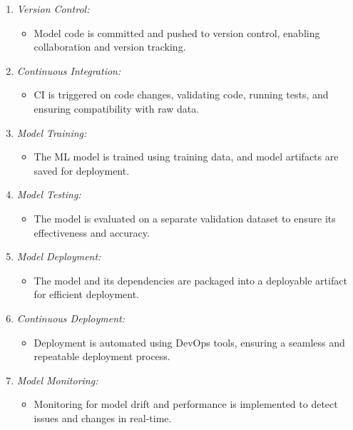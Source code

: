 \documentclass[12pt, letterpaper]{article}
\begin{document}
\begin{enumerate}
    \item \textit{Version Control:}
    \begin{itemize}
        \item Model code is committed and pushed to version control, enabling collaboration and version tracking.
    \end{itemize}
    
    \item \textit{Continuous Integration:}
    \begin{itemize}
        \item CI is triggered on code changes, validating code, running tests, and ensuring compatibility with raw data.
    \end{itemize}
    
    \item \textit{Model Training:}
    \begin{itemize}
        \item The ML model is trained using training data, and model artifacts are saved for deployment.
    \end{itemize}
    
    \item \textit{Model Testing:}
    \begin{itemize}
        \item The model is evaluated on a separate validation dataset to ensure its effectiveness and accuracy.
    \end{itemize}
    
    \item \textit{Model Deployment:}
    \begin{itemize}
        \item The model and its dependencies are packaged into a deployable artifact for efficient deployment.
    \end{itemize}
    
    \item \textit{Continuous Deployment:}
    \begin{itemize}
        \item Deployment is automated using DevOps tools, ensuring a seamless and repeatable deployment process.
    \end{itemize}
    
    \item \textit{Model Monitoring:}
    \begin{itemize}
        \item Monitoring for model drift and performance is implemented to detect issues and changes in real-time.
    \end{itemize}
    

\end{enumerate}
\end{document}
